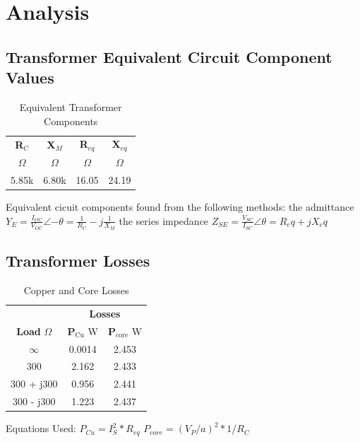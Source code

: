 \documentclass{article}
\begin{document}
\section{Analysis}
\subsection{Transformer Equivalent Circuit Component Values}
\begin{table}[H]
  \centering
  \begin{tabular}{*{4}{c}}
    \textbf{R$_C$} & \textbf{X$_M$}
    & \textbf{R$_{eq}$} & \textbf{X$_{eq}$} \\
    $\Omega$ & $\Omega$ &$\Omega$ & $\Omega$ \\
    \hline
    5.85k & 6.80k & 16.05 & 24.19 \\
  \end{tabular}
  \caption{Equivalent Transformer Components}
  \label{tab:equiv_comp}
\end{table}

Equivalent cicuit components found from the following methods:
the admittance $Y_E = \frac{I_{OC}}{V_{OC}}\angle{-\theta} = \frac{1}{R_C} -
j\frac{1}{X_M}$
the series impedance $Z_{SE} = \frac{V_{SC}}{I_{SC}}\angle{\theta} = R_eq + jX_eq$

\subsection{Transformer Losses}
\begin{table}[H]
  \centering
  \begin{tabular}{*{3}{c}}
    & \multicolumn{2}{c}{\textbf{Losses}} \\
    \textbf{Load} $\Omega$ & \textbf{P$_\text{Cu}$} W & \textbf{P$_\text{core}$} W \\
    \hline
    $\infty$ & 0.0014 & 2.453 \\
    300 & 2.162 & 2.433 \\
    300 + j300 & 0.956 & 2.441 \\
    300 - j300 & 1.223 & 2.437 \\
  \end{tabular}
  \caption{Copper and Core Losses}
  \label{tab:power_losses}
\end{table}

Equations Used:
$P_{Cu} = I_S^2 * R_{eq}$
$P_{core} = (V_P / a)^2 * 1/R_{C}$
\end{document}

